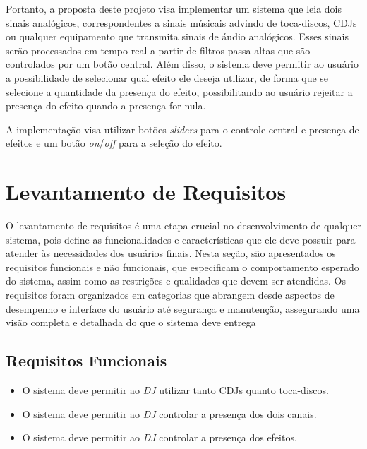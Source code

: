 \par
Portanto, a proposta deste projeto visa implementar um sistema que leia dois sinais analógicos, correspondentes a sinais músicais advindo de toca-discos, CDJs ou qualquer equipamento que transmita sinais de áudio analógicos. Esses sinais serão processados em tempo real a partir de filtros passa-altas que são controlados por um botão central. Além disso, o sistema deve permitir ao usuário a possibilidade de selecionar qual efeito ele deseja utilizar, de forma que se selecione a quantidade da presença do efeito, possibilitando ao usuário rejeitar a presença do efeito quando a presença for nula.
\par
A implementação visa utilizar botões \textit{sliders} para o controle central e presença de efeitos e um botão \textit{on}/\textit{off} para a seleção do efeito. 

\section{Levantamento de Requisitos}

O levantamento de requisitos é uma etapa crucial no desenvolvimento de qualquer sistema, pois define as funcionalidades e características que ele deve possuir para atender às necessidades dos usuários finais. Nesta seção, são apresentados os requisitos funcionais e não funcionais, que especificam o comportamento esperado do sistema, assim como as restrições e qualidades que devem ser atendidas. Os requisitos foram organizados em categorias que abrangem desde aspectos de desempenho e interface do usuário até segurança e manutenção, assegurando uma visão completa e detalhada do que o sistema deve entrega

\subsection{Requisitos Funcionais}
\begin{itemize}
    \item O sistema deve permitir ao \textit{DJ} utilizar tanto CDJs quanto toca-discos.
    \item O sistema deve permitir ao \textit{DJ} controlar a presença dos dois canais.
    \item O sistema deve permitir ao \textit{DJ} controlar a presença dos efeitos.
\end{itemize}


